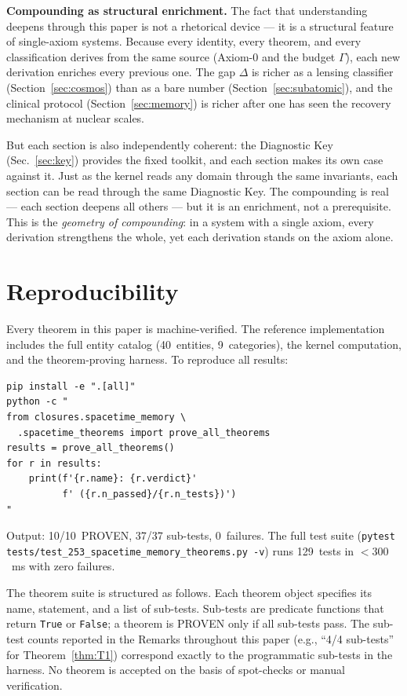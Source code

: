 \documentclass[
  aps,
  prd,
  twocolumn,
  superscriptaddress,
  nofootinbib,
  floatfix
]{revtex4-2}
\newcommand{\Gam}{\Gamma}
\begin{document}
\textbf{Compounding as structural enrichment.}
The fact that understanding deepens through this paper is
not a rhetorical device --- it is a structural feature of
single-axiom systems.  Because every identity, every theorem,
and every classification derives from the same source
(Axiom-0 and the budget $\Gam$), each new derivation enriches
every previous one.  The gap $\Delta$ is richer as a lensing
classifier (Section~\ref{sec:cosmos}) than as a bare number
(Section~\ref{sec:subatomic}), and the clinical protocol
(Section~\ref{sec:memory}) is richer after one has seen the
recovery mechanism at nuclear scales.

But each section is also independently coherent: the
Diagnostic Key (Sec.~\ref{sec:key}) provides the fixed
toolkit, and each section makes its own case against it.
Just as the kernel reads any domain through the same
invariants, each section can be read through the same
Diagnostic Key.  The compounding is real --- each section
deepens all others --- but it is an enrichment, not a
prerequisite.  This is the \emph{geometry of
compounding}: in a system with a single axiom, every
derivation strengthens the whole, yet each derivation
stands on the axiom alone.


\section{Reproducibility}\label{sec:howto}

Every theorem in this paper is machine-verified.  The
reference implementation~\cite{umcpmetadatarepo} includes
the full entity catalog (40~entities, 9~categories), the
kernel computation, and the theorem-proving harness.  To
reproduce all results:

\begin{verbatim}
pip install -e ".[all]"
python -c "
from closures.spacetime_memory \
  .spacetime_theorems import prove_all_theorems
results = prove_all_theorems()
for r in results:
    print(f'{r.name}: {r.verdict}'
          f' ({r.n_passed}/{r.n_tests})')
"
\end{verbatim}

Output: 10/10~PROVEN, 37/37 sub-tests, 0~failures.  The
full test suite (\texttt{pytest
tests/test\_253\_spacetime\_memory\_theorems.py -v})
runs 129~tests in $< 300$~ms with zero failures.

The theorem suite is structured as follows.  Each theorem
object specifies its name, statement, and a list of
sub-tests.  Sub-tests are predicate functions that return
\texttt{True} or \texttt{False}; a theorem is PROVEN only
if all sub-tests pass.  The sub-test counts reported in
the Remarks throughout this paper (e.g., ``4/4 sub-tests''
for Theorem~\ref{thm:T1}) correspond exactly to the
programmatic sub-tests in the harness.  No theorem is
accepted on the basis of spot-checks or manual verification.
\end{document}
